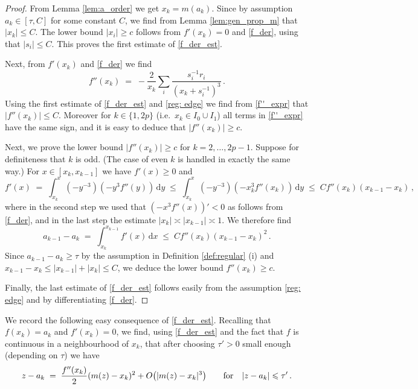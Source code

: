 \documentclass[11pt]{article} %
\numberwithin{equation}{section}
\numberwithin{figure}{section}
\theoremstyle{plain} %
\theoremstyle{definition} %
\newcommand{\txt}[1]{\text{\rm{#1}}}
\newcommand{\dd}{\mathrm{d}}
\renewcommand{\leq}{\leqslant}
\renewcommand{\geq}{\geqslant}
\newcommand{\pb}[1]{\bigl({#1}\bigr)}
\newcommand{\abs}[1]{\lvert #1 \rvert}
\begin{document}
\begin{proof}
From Lemma \ref{lem:a_order} we get $x_k = m(a_k)$. Since by assumption $a_k \in [\tau,C]$ for some constant $C$, we find from Lemma \ref{lem:gen_prop_m} that $\abs{x_k} \leq C$. The lower bound $\abs{x_i} \geq c$ follows from $f'(x_k) = 0$ and \eqref{f_der}, using that $\abs{s_i} \leq C$. This proves the first estimate of \eqref{f_der_est}.

Next, from $f'(x_k)$ and \eqref{f_der} we find
\begin{equation} \label{f''_expr}
f''(x_k) \;=\; - \frac{2}{x_k} \sum_i \frac{s_i^{-1} r_i}{(x_k + s_i^{-1})^3}\,.
\end{equation}
Using the first estimate of \eqref{f_der_est} and \eqref{reg: edge} we find from \eqref{f''_expr} that $\abs{f''(x_k)} \leq C$. Moreover for $k \in \{1, 2p\}$ (i.e.\ $x_k \in I_0 \cup I_1$) all terms in \eqref{f''_expr} have the same sign, and it is easy to deduce that $\abs{f''(x_k)} \geq c$.

Next, we prove the lower bound $\abs{f''(x_k)} \geq c$ for $k = 2, \dots, 2p - 1$. Suppose for definiteness that $k$ is odd. (The case of even $k$ is handled in exactly the same way.) For $x \in [x_k, x_{k-1}]$ we have $f'(x) \geq 0$ and
\begin{equation*}
f'(x) \;=\; \int_{x_k}^x (-y^{-3}) (- y^3 f''(y)) \, \dd y \;\leq\; \int_{x_k}^x (-y^{-3}) (- x_k^3 f''(x_k)) \, \dd y \;\leq\; C f''(x_k) (x_{k-1} - x_k)\,,
\end{equation*}
where in the second step we used that $(-x^3 f''(x))' < 0$ as follows from \eqref{f_der}, and in the last step the estimate $\abs{x_k} \asymp \abs{x_{k-1}} \asymp 1$. We therefore find
\begin{equation*}
a_{k-1} - a_k \;=\; \int_{x_k}^{x_{k-1}} f'(x) \, \dd x \;\leq\; C f''(x_k) (x_{k-1} - x_k)^2\,.
\end{equation*}
Since $a_{k-1} - a_k \geq \tau$ by the assumption in Definition \ref{def:regular} (i) and $x_{k-1} - x_k \leq \abs{x_{k-1}} + \abs{x_k} \leq C$, we deduce the lower bound $f''(x_k) \geq c$.

Finally, the last estimate of \eqref{f_der_est} follows easily from the assumption \eqref{reg: edge} and by differentiating \eqref{f_der}.
\end{proof}


We record the following easy consequence of \eqref{f_der_est}. Recalling that $f(x_k) = a_k$ and $f'(x_k) = 0$, we find, using \eqref{f_der_est} and the fact that $f$ is continuous in a neighbourhood of $x_k$, that after choosing $\tau' > 0$ small enough (depending on $\tau$) we have
\begin{equation} \label{z-a_taylor}
z - a_k \;=\; \frac{f''(x_k)}{2} (m(z) - x_k)^2 + O \pb{\abs{m(z) - x_k}^3} \qquad \txt{for} \quad \abs{z - a_k} \leq \tau'\,.
\end{equation}
\end{document}
